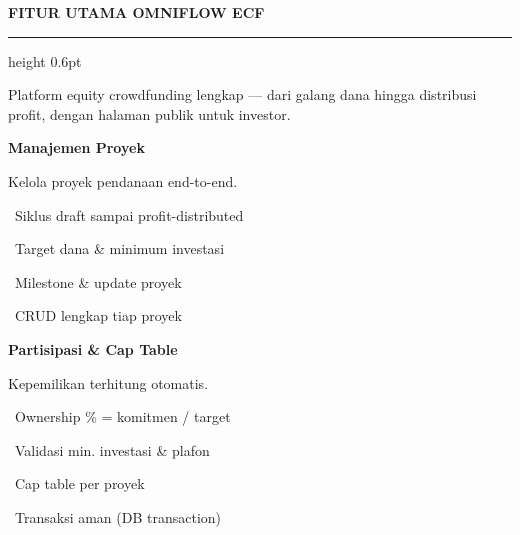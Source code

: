 \documentclass[a4paper]{article}
\newcommand{\sectiontitle}[1]{%
    \vspace{10pt}%
    {\fontsize{13}{16}\selectfont\bfseries\color{BlueDark} #1}\par\vspace{3pt}%
    {\color{BluePrimary}\hrule height 0.6pt}\par\vspace{8pt}%
}
\begin{document}
\sectiontitle{FITUR UTAMA OMNIFLOW ECF}

{\fontsize{9.5}{13}\selectfont\color{TextLight} Platform equity crowdfunding lengkap --- dari galang dana hingga distribusi profit, dengan halaman publik untuk investor.}

\vspace{6pt}

\noindent
\begin{minipage}[t]{0.485\textwidth}
    \colorbox{BluePrimary}{%
        \begin{minipage}{\dimexpr\textwidth-2\fboxsep\relax}
            {\fontsize{10}{13}\selectfont\bfseries\color{White} Manajemen Proyek}
        \end{minipage}}\par
    \vspace{4pt}
    {\fontsize{9}{12}\selectfont\color{TextDark}%
    Kelola proyek pendanaan end-to-end.\par\vspace{3pt}
    \textbullet\ Siklus draft sampai profit-distributed\par\vspace{2pt}%
    \textbullet\ Target dana \& minimum investasi\par\vspace{2pt}%
    \textbullet\ Milestone \& update proyek\par\vspace{2pt}%
    \textbullet\ CRUD lengkap tiap proyek}%

\end{minipage}%
\hfill
\begin{minipage}[t]{0.485\textwidth}
    \colorbox{EmeraldPrimary}{%
        \begin{minipage}{\dimexpr\textwidth-2\fboxsep\relax}
            {\fontsize{10}{13}\selectfont\bfseries\color{White} Partisipasi \& Cap Table}
        \end{minipage}}\par
    \vspace{4pt}
    {\fontsize{9}{12}\selectfont\color{TextDark}%
    Kepemilikan terhitung otomatis.\par\vspace{3pt}
    \textbullet\ Ownership \% = komitmen / target\par\vspace{2pt}%
    \textbullet\ Validasi min. investasi \& plafon\par\vspace{2pt}%
    \textbullet\ Cap table per proyek\par\vspace{2pt}%
    \textbullet\ Transaksi aman (DB transaction)}%

\end{minipage}
\end{document}
